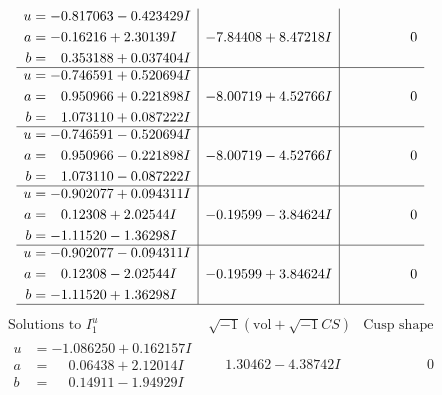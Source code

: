 \documentclass[1p]{elsarticle_modified}
\theoremstyle{definition}
\newcommand{\I}{\sqrt{-1}}
\begin{document}
$$\begin{array}{c|c|c}
\begin{aligned}
u &= -0.817063 - 0.423429 I \\
a &= -0.16216 + 2.30139 I \\
b &= \phantom{-}0.353188 + 0.037404 I\end{aligned}
 & -7.84408 + 8.47218 I & \phantom{-0.000000 } 0 \\ \hline\begin{aligned}
u &= -0.746591 + 0.520694 I \\
a &= \phantom{-}0.950966 + 0.221898 I \\
b &= \phantom{-}1.073110 + 0.087222 I\end{aligned}
 & -8.00719 + 4.52766 I & \phantom{-0.000000 } 0 \\ \hline\begin{aligned}
u &= -0.746591 - 0.520694 I \\
a &= \phantom{-}0.950966 - 0.221898 I \\
b &= \phantom{-}1.073110 - 0.087222 I\end{aligned}
 & -8.00719 - 4.52766 I & \phantom{-0.000000 } 0 \\ \hline\begin{aligned}
u &= -0.902077 + 0.094311 I \\
a &= \phantom{-}0.12308 + 2.02544 I \\
b &= -1.11520 - 1.36298 I\end{aligned}
 & -0.19599 - 3.84624 I & \phantom{-0.000000 } 0 \\ \hline\begin{aligned}
u &= -0.902077 - 0.094311 I \\
a &= \phantom{-}0.12308 - 2.02544 I \\
b &= -1.11520 + 1.36298 I\end{aligned}
 & -0.19599 + 3.84624 I & \phantom{-0.000000 } 0\\
 \hline 
 \end{array}$$\newpage$$\begin{array}{c|c|c}  
\text{Solutions to }I^u_{1}& \I (\text{vol} + \sqrt{-1}CS) & \text{Cusp shape}\\
 \hline 
\begin{aligned}
u &= -1.086250 + 0.162157 I \\
a &= \phantom{-}0.06438 + 2.12014 I \\
b &= \phantom{-}0.14911 - 1.94929 I\end{aligned}
 & \phantom{-}1.30462 - 4.38742 I & \phantom{-0.000000 } 0 \\ \hline\begin{aligned}

\end{aligned}
\end{array}$$
\end{document}
